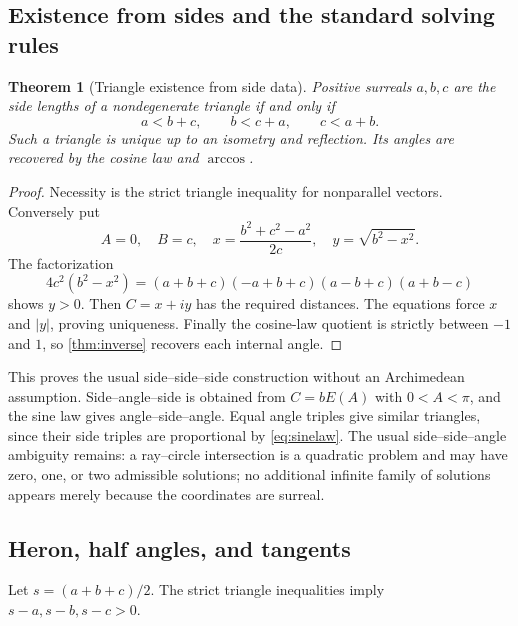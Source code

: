 \documentclass[11pt,letterpaper]{article}
\newtheorem{theorem}{Theorem}[section]
\theoremstyle{definition}
\theoremstyle{remark}
\newcommand{\arcc}{\operatorname{arccos}}
\numberwithin{equation}{section}
\begin{document}
\subsection{Existence from sides and the standard solving rules}
\begin{theorem}[Triangle existence from side data]\label{thm:existtriangle}
Positive surreals $a,b,c$ are the side lengths of a nondegenerate triangle if and only if
\[
 a<b+c,\qquad b<c+a,\qquad c<a+b.
\]
Such a triangle is unique up to an isometry and reflection. Its angles are recovered by the cosine law and $\arcc$.
\end{theorem}
\begin{proof}
Necessity is the strict triangle inequality for nonparallel vectors. Conversely put
\[
 A=0,\quad B=c,\quad
 x=\frac{b^2+c^2-a^2}{2c},\quad
 y=\sqrt{b^2-x^2}.
\]
The factorization
\begin{equation}\label{eq:heronfactor}
 4c^2(b^2-x^2)
 =(a+b+c)(-a+b+c)(a-b+c)(a+b-c)
\end{equation}
shows $y>0$. Then $C=x+iy$ has the required distances. The equations force $x$ and $|y|$, proving uniqueness. Finally the cosine-law quotient is strictly between $-1$ and $1$, so \cref{thm:inverse} recovers each internal angle.
\end{proof}
This proves the usual side--side--side construction without an Archimedean assumption. Side--angle--side is obtained from $C=bE(A)$ with $0<A<\pi$, and the sine law gives angle--side--angle. Equal angle triples give similar triangles, since their side triples are proportional by \eqref{eq:sinelaw}. The usual side--side--angle ambiguity remains: a ray--circle intersection is a quadratic problem and may have zero, one, or two admissible solutions; no additional infinite family of solutions appears merely because the coordinates are surreal.

\subsection{Heron, half angles, and tangents}
Let $s=(a+b+c)/2$. The strict triangle inequalities imply $s-a,s-b,s-c>0$.
\end{document}
